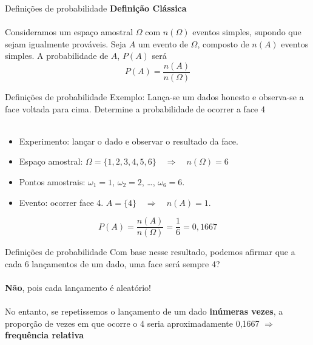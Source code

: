 \documentclass[10pt]{beamer}\usepackage[]{graphicx}\usepackage[]{color}
\theoremstyle{definition}
\begin{document}
\begin{frame}{Definições de probabilidade}
  \textbf{Definição Clássica}\\~\\
  Consideramos um espaço amostral $\Omega$ com $n(\Omega)$ eventos simples,
  supondo que sejam igualmente prováveis. Seja $A$ um evento de
  $\Omega$, composto de $n(A)$ eventos simples. A probabilidade de $A$,
  $P(A)$ será
  \begin{equation*}
    P(A) = \frac{n(A)}{n(\Omega)}
  \end{equation*}
\end{frame}

\begin{frame}{Definições de probabilidade}
  Exemplo: Lança-se um dados honesto e observa-se a face voltada para
  cima. Determine a probabilidade de ocorrer a face 4\\~\\ \pause
  \begin{itemize}
  \item Experimento: lançar o dado e observar o resultado da
    face.
  \item Espaço amostral: $\Omega=\{1,2,3,4,5,6\} \quad \Rightarrow \quad
    n(\Omega) = 6$
  \item Pontos amostrais: $\omega_1=\text{1}$, $\omega_2=\text{2}$,
    \ldots, $\omega_6=\text{6}$.
  \item Evento: ocorrer face 4. $A = \{4\} \quad \Rightarrow \quad n(A) = 1$.
  \end{itemize}
  \begin{equation*}
    P(A) = \frac{n(A)}{n(\Omega)} = \frac{1}{6} = 0,1667
  \end{equation*}
\end{frame}

\begin{frame}{Definições de probabilidade}
  Com base nesse resultado, podemos afirmar que a cada 6 lançamentos de
  um dado, uma face será sempre 4? \\~\\ \pause
  \textbf{Não}, pois cada lançamento é aleatório! \\~\\
  No entanto, se repetissemos o lançamento de um dado \textbf{inúmeras
    vezes}, a proporção de vezes em que ocorre o 4 seria aproximadamente
  0,1667 $\Rightarrow$ \textbf{frequência relativa}
\end{frame}
\end{document}
